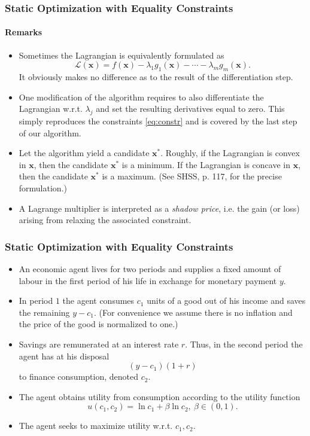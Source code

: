 \documentclass[10pt]{beamer}
\theoremstyle{definition}
\begin{document}
\begin{frame}[fragile]
\frametitle{Static Optimization with Equality Constraints}
\framesubtitle{Remarks}
\begin{itemize}
\item Sometimes the Lagrangian is equivalently formulated as \[ \mathcal{L}(\mathbf{x}) = f(\mathbf{x}) - \lambda_1 g_1(\mathbf{x}) - \cdots - \lambda_m g_m(\mathbf{x}). \] It obviously makes no difference as to the result of the differentiation step.
\item One modification of the algorithm requires to also differentiate the Lagrangian w.r.t. $ \lambda_j $ and set the resulting derivatives equal to zero. This simply reproduces the constraints \eqref{eq:constr} and is covered by the last step of our algorithm.
\item Let the algorithm yield a candidate $ \mathbf{x^*} $. Roughly, if the Lagrangian is convex in $ \mathbf{x} $, then the candidate $ \mathbf{x^*} $ is a minimum. If the Lagrangian is concave in $ \mathbf{x} $, then the candidate $ \mathbf{x^*} $ is a maximum. (See SHSS, p. 117, for the precise formulation.)
\item A Lagrange multiplier is interpreted as a \emph{shadow price}, i.e. the gain (or loss) arising from relaxing the associated constraint.
\end{itemize}
\end{frame}

\begin{frame}[fragile]
\frametitle{Static Optimization with Equality Constraints}
\begin{example}
\begin{itemize}
\item An economic agent lives for two periods and supplies a fixed amount of labour in the first period of his life in exchange for monetary payment $ y $.
\item In period $ 1 $ the agent consumes $ c_1 $ units of a good out of his income and saves the remaining $ y-c_1 $.  (For convenience we assume there is no inflation and the price of the good is normalized to one.)
\item Savings are remunerated at an interest rate $ r $. Thus, in the second period the agent has at his disposal \[ (y-c_1)(1+r) \] to finance consumption, denoted $ c_2 $.
\item  The agent obtains utility from consumption according to the utility function
\[ u(c_1,c_2) = \ln c_1 + \beta \ln c_2,~\beta \in (0,1) . \]
\item The agent seeks to maximize utility w.r.t. $ c_1,c_2 $.
\end{itemize}
\label{ex:intertemp}
\end{example}
\end{frame}
\end{document}
